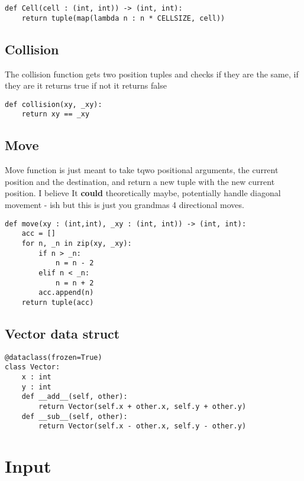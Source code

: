 \documentclass[11pt]{article}
\begin{document}
\begin{verbatim}
def Cell(cell : (int, int)) -> (int, int):
    return tuple(map(lambda n : n * CELLSIZE, cell))
\end{verbatim}


\subsection{Collision}
\label{sec:orgf07b063}

The collision function gets two position tuples and checks if they are the same, if they are it returns true if not it returns false

\begin{verbatim}
def collision(xy, _xy):
    return xy == _xy
\end{verbatim}


\subsection{Move}
\label{sec:org9997826}

Move function is just meant to take tqwo positional arguments, the current position and the destination, and return a new tuple with the new current position. I believe It \textbf{could} theoretically maybe, potentially handle diagonal movement - ish but this is just you grandmas 4 directional moves.

\begin{verbatim}
def move(xy : (int,int), _xy : (int, int)) -> (int, int):
    acc = []
    for n, _n in zip(xy, _xy):
        if n > _n:
            n = n - 2
        elif n < _n:
            n = n + 2
        acc.append(n)
    return tuple(acc)

\end{verbatim}


\subsection{Vector data struct}
\label{sec:orgab78fa8}

\begin{verbatim}
@dataclass(frozen=True)
class Vector:
    x : int
    y : int
    def __add__(self, other):
        return Vector(self.x + other.x, self.y + other.y)
    def __sub__(self, other):
        return Vector(self.x - other.x, self.y - other.y)
\end{verbatim}


\section{Input}
\label{sec:org466a1c6}
\end{document}
